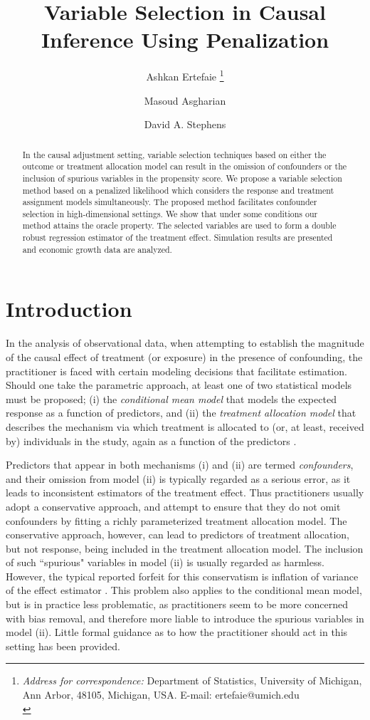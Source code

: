 \documentclass[11pt]{statsoc}
\title{Variable Selection in Causal Inference Using Penalization}
\author[ ] {Ashkan Ertefaie \footnote{\tiny{\it Address for correspondence:} Department
of Statistics, University of Michigan, Ann Arbor, 48105, Michigan, USA. E-mail: ertefaie@umich.edu\\}}
\author[ ] {Masoud Asgharian}
\author[ ] {David A. Stephens}
\begin{document}
\begin{abstract}
In the causal adjustment setting, variable selection techniques based on either the outcome or treatment allocation model can result in the omission of confounders or the inclusion of spurious variables in the propensity score.  We propose a variable selection method based on a penalized likelihood which considers the response and treatment assignment models simultaneously. The proposed method facilitates confounder selection in high-dimensional settings. We show that under some conditions our method attains the oracle property. The selected variables are used to form a double robust regression estimator of the treatment effect.
Simulation results are presented and  economic growth data are analyzed.


\end{abstract}

\section{Introduction} \label{intro}

In the analysis of observational data, when attempting to establish the magnitude of the causal effect of treatment (or exposure) in the presence of confounding, the practitioner is faced with certain modeling decisions that facilitate estimation.  Should one take the parametric approach, at least one of two statistical models must be proposed; (i) the \textit{conditional mean model} that models the expected response as a function of predictors, and (ii) the \textit{treatment allocation model} that describes the mechanism via which treatment is allocated to (or, at least, received by) individuals in the study, again as a function of the predictors \citep{rosenbaum1983central, robins2000marginal}.

Predictors that appear in both mechanisms (i) and (ii) are termed \textit{confounders}, and their omission from model (ii) is typically regarded as a serious error, as it leads to inconsistent estimators of the treatment effect. Thus practitioners usually adopt a conservative approach, and attempt to ensure that they do not omit confounders by fitting a richly parameterized treatment allocation model. 
The conservative approach, however, can lead to predictors of treatment allocation, but not response, being included in the treatment allocation model. The inclusion of such ``spurious" variables in model (ii) is usually regarded as harmless.  However, the typical reported forfeit for this conservatism is inflation of variance of the effect estimator \citep{greenland2008invited, schisterman2009overadjustment}.  This problem also applies to the conditional mean model, but is in practice less problematic, as practitioners seem to be more concerned with bias removal, and therefore more liable to introduce the spurious variables in model (ii).  Little formal guidance as to how the practitioner should act in this setting has been provided.
\end{document}
